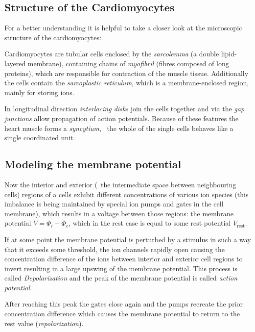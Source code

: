 \subsection{Structure of the Cardiomyocytes}
For a better understanding it is helpful to take a closer look at the
microscopic structure of the cardiomyocytes:

Cardiomyocytes are tubular cells enclosed by the \emph{sarcolemma} (a double
lipid-layered membrane), containing chains of \emph{myofibril} (fibres composed
of long proteins), which are responsible for contraction of the muscle tissue.
Additionally the cells contain the \emph{sarcoplastic reticulum}, which is a
membrane-enclosed region, mainly for storing  ions.

In longitudinal direction \emph{interlacing disks} join the cells together
and via the \emph{gap junctions} allow propagation of action potentials.
Because of these features the heart muscle forms a \emph{syncytium}, \ie~the
whole of the single cells behaves like a single coordinated unit.


\subsection{Modeling the membrane potential}
Now the interior and exterior (\ie~the intermediate space between
neighbouring cells) regions of a cells exhibit different concentrations of
various ion species (this imbalance is being maintained by special ion
pumps and gates in the cell membrane), which results in a voltage between
those regions: the membrane potential $V=\Phi_i-\Phi_e$, which in the rest
case is equal to some rest potential $V_{\mathrm{rest}}$.

If at some point the membrane potential is perturbed by a stimulus in such
a way that it exceeds some threshold, the ion channels rapidly open causing
the concentration difference of the ions between interior and exterior
cell regions to invert resulting in a large upswing of the membrane
potential. This process is called \emph{Depolarization} and the peak of the
membrane potential is called \emph{action potential}.

After reaching this peak the gates close again and the pumps recreate the
prior concentration difference which causes the membrane potential to
return to the rest value (\emph{repolarization}).

